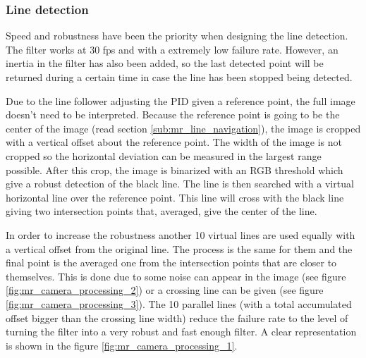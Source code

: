 	\subsubsection{Line detection} %
	\label{ssub:line_detection}
	Speed and robustness have been the priority when designing the line detection.
	The filter works at 30 fps and with a extremely low failure rate.
	However, an inertia in the filter has also been added, so the last detected point will be returned during a certain time in case the line has been stopped being detected.

	Due to the line follower adjusting the PID given a reference point, the full image doesn't need to be interpreted.
	Because the reference point is going to be the center of the image (read section \ref{sub:mr_line_navigation}), the image is cropped with a vertical offset about the reference point.
	The width of the image is not cropped so the horizontal deviation can be measured in the largest range possible.
	After this crop, the image is binarized with an RGB threshold which give a robust detection of the black line.
	The line is then searched with a virtual horizontal line over the reference point.
	This line will cross with the black line giving two intersection points that, averaged, give the center of the line.

	In order to increase the robustness another 10 virtual lines are used equally with a vertical offset from the original line.
	The process is the same for them and the final point is the averaged one from the intersection points that are closer to themselves.
	This is done due to some noise can appear in the image (see figure \ref{fig:mr_camera_processing_2}) or a crossing line can be given (see figure \ref{fig:mr_camera_processing_3}).
	The 10 parallel lines (with a total accumulated offset bigger than the crossing line width) reduce the failure rate to the level of turning the filter into a very robust and fast enough filter.
	A clear representation is shown in the figure \ref{fig:mr_camera_processing_1}.

